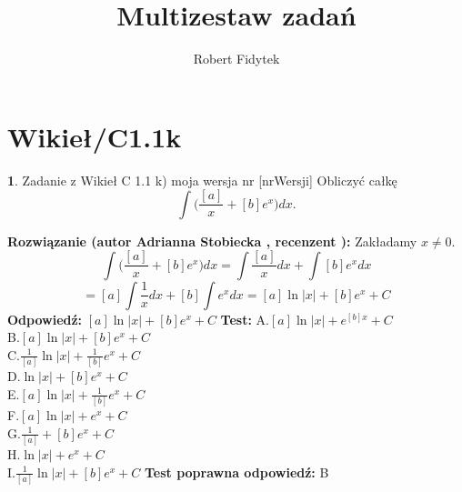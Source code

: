 \documentclass[12pt, a4paper]{article}
\title{Multizestaw zadań}
\author{Robert Fidytek}
\date{}
\theoremstyle{definition} %
\newtheorem{zad}{}
\newcommand{\kategoria}[1]{\section{#1}} %
\newcommand{\zadStart}[1]{\begin{zad}#1\newline} %
\newcommand{\zadStop}{\end{zad}}   %
\newcommand{\rozwStart}[2]{\noindent \textbf{Rozwiązanie (autor #1 , recenzent #2): }\newline} %
\newcommand{\rozwStop}{\newline}                                            %
\newcommand{\odpStart}{\noindent \textbf{Odpowiedź:}\newline}    %
\newcommand{\odpStop}{\newline}                                             %
\newcommand{\testStart}{\noindent \textbf{Test:}\newline} %
\newcommand{\testStop}{\newline} %
\newcommand{\kluczStart}{\noindent \textbf{Test poprawna odpowiedź:}\newline} %
\newcommand{\kluczStop}{\newline} %
\begin{document}
\maketitle


\kategoria{Wikieł/C1.1k}
\zadStart{Zadanie z Wikieł C 1.1 k) moja wersja nr [nrWersji]}
Obliczyć całkę $$\int\bigg(\frac{[a]}{x}+[b]e^{x}\bigg)dx.$$
\zadStop
\rozwStart{Adrianna Stobiecka}{}
Zakładamy $x\ne0$.
$$\int\bigg(\frac{[a]}{x}+[b]e^{x}\bigg)dx=\int\frac{[a]}{x}dx+\int[b]e^{x}dx$$
$$=[a]\int\frac{1}{x}dx+[b]\int e^{x}dx=[a]\ln{|x|}+[b]e^{x}+C$$
\rozwStop
\odpStart
$[a]\ln{|x|}+[b]e^{x}+C$
\odpStop
\testStart
A.$[a]\ln{|x|}+e^{[b]x}+C$\\
B.$[a]\ln{|x|}+[b]e^{x}+C$\\
C.$\frac{1}{[a]}\ln{|x|}+\frac{1}{[b]}e^{x}+C$\\
D.$\ln{|x|}+[b]e^{x}+C$\\
E.$[a]\ln{|x|}+\frac{1}{[b]}e^{x}+C$\\
F.$[a]\ln{|x|}+e^{x}+C$\\
G.$\frac{1}{[a]}+[b]e^{x}+C$\\
H.$\ln{|x|}+e^{x}+C$\\
I.$\frac{1}{[a]}\ln{|x|}+[b]e^{x}+C$
\testStop
\kluczStart
B
\kluczStop
\end{document}
